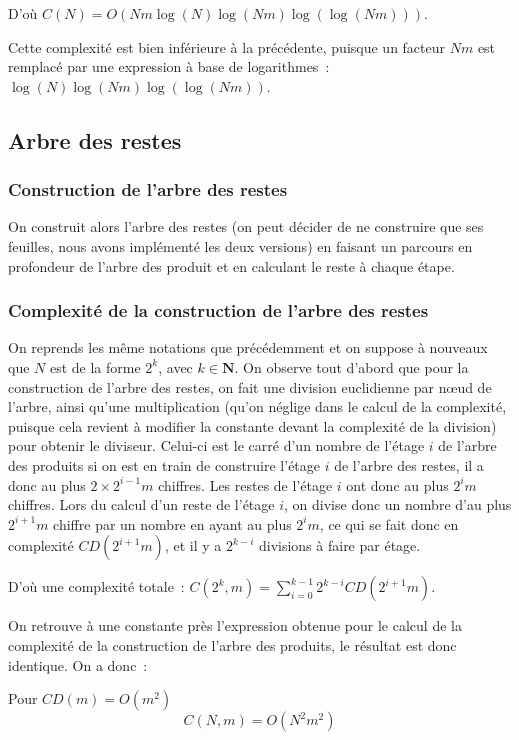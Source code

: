 \documentclass[a4paper,10pt]{article}
\begin{document}
  D'où $C(N) = O(Nm\log(N)\log(Nm)\log(\log(Nm)))$.
  
  Cette complexité est bien inférieure à la précédente, puisque un facteur $Nm$ est remplacé par une expression à base de logarithmes~: $\log(N)\log(Nm)\log(\log(Nm))$.

  \subsection{Arbre des restes}
  \subsubsection{Construction de l'arbre des restes}
  On construit alors l'arbre des restes (on peut décider de ne construire que ses feuilles, nous avons implémenté les deux versions) en faisant un parcours en profondeur de l'arbre des produit et en calculant le reste à chaque étape.
  
  \subsubsection{Complexité de la construction de l'arbre des restes\label{sn:complexite_arb_rst}}
  On reprends les même notations que précédemment et on suppose à nouveaux que $N$ est de la forme $2^k$, avec $k\in\mathbf{N}$.
  On observe tout d'abord que pour la construction de l'arbre des restes, on fait une division euclidienne par nœud de l'arbre, ainsi qu'une multiplication (qu'on néglige dans le calcul de la complexité, puisque cela revient à modifier la constante devant la complexité de la division) pour obtenir le diviseur. Celui-ci est le carré d'un nombre de l'étage $i$ de l'arbre des produits si on est en train de construire l'étage $i$ de l'arbre des restes, il a donc au plus $2 \times 2^{i-1}m$ chiffres. Les restes de l'étage $i$ ont donc au plus $2^i m$ chiffres.
  Lors du calcul d'un reste de l'étage $i$, on divise donc un nombre d'au plus $2^{i+1}m$ chiffre par un nombre en ayant au plus $2^i m$, ce qui se fait donc en complexité $CD(2^{i+1}m)$, et il y a $2^{k-i}$ divisions à faire par étage.
  
  D'où une complexité totale~: $C(2^k, m) = \sum_{i=0}^{k-1}2^{k-i}CD(2^{i+1}m)$.
  
  On retrouve à une constante près l'expression obtenue pour le calcul de la complexité de la construction de l'arbre des produits, le résultat est donc identique.
  On a donc~:
  
  Pour $CD(m) = O(m^2)$
  \[
   C(N,m) = O(N^2m^2)
  \]
  
\end{document}
